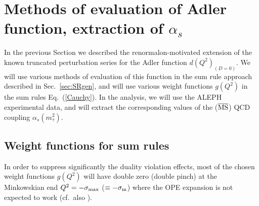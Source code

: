 \documentclass[aps,nofootinbib,showkeys,noshowpacs,preprintnumbers,amsmath,amssymb]{revtex4}
\newcommand{\sm}{{\sigma_{\rm m}}}
\newcommand{\MSbar}{\overline{\rm MS}}
\begin{document}
\section{Methods of evaluation of Adler function, extraction of $\alpha_s$}
\label{sec:extr}

In the previous Section we described the renormalon-motivated extension of the known truncated perturbation series for the Adler function $d(Q^2)_{(D=0)}$. We will use various methods of evaluation of this function in the sum rule approach described in Sec.~\ref{sec:SRgen}, and will use various weight functions $g(Q^2)$ in the sum rules Eq.~(\ref{Cauchy}). In the analysis, we will use the ALEPH experimental data, and will extract the corresponding values of the ($\MSbar$) QCD coupling $\alpha_s(m_{\tau}^2)$.

\subsection{Weight functions for sum rules}
\label{subs:weight}

In order to suppress significantly the duality violation effects, most of the chosen weight functions $g(Q^2)$ will have double zero (double pinch) at the Minkowskian end $Q^2=-\sigma_{\rm max}$ ($\equiv -\sm$) where the OPE expansion is not expected to work \cite{Pich} (cf.~also \cite{BNP92,DP92,Chib,Malt,DomSch,Cir,GonzAl,Dom,RSan}).
\end{document}
